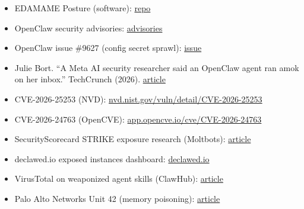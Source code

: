 \documentclass[
]{article}
\providecommand{\tightlist}{%
  \setlength{\itemsep}{0pt}\setlength{\parskip}{0pt}}
\begin{document}
\begin{itemize}
\tightlist
\item
  EDAMAME Posture (software):
  \href{https://github.com/edamametechnologies/edamame_posture}{repo}
\item
  OpenClaw security advisories:
  \href{https://github.com/openclaw/openclaw/security/advisories}{advisories}
\item
  OpenClaw issue \#9627 (config secret sprawl):
  \href{https://github.com/openclaw/openclaw/issues/9627}{issue}
\item
  Julie Bort. ``A Meta AI security researcher said an OpenClaw agent ran
  amok on her inbox.'' TechCrunch (2026).
  \href{https://techcrunch.com/2026/02/23/a-meta-ai-security-researcher-said-an-openclaw-agent-ran-amok-on-her-inbox/}{article}
\item
  CVE-2026-25253 (NVD):
  \href{https://nvd.nist.gov/vuln/detail/CVE-2026-25253}{nvd.nist.gov/vuln/detail/CVE-2026-25253}
\item
  CVE-2026-24763 (OpenCVE):
  \href{https://app.opencve.io/cve/CVE-2026-24763}{app.opencve.io/cve/CVE-2026-24763}
\item
  SecurityScorecard STRIKE exposure research (Moltbots):
  \href{https://securityscorecard.com/blog/beyond-the-hype-moltbots-real-risk-is-exposed-infrastructure-not-ai-superintelligence/}{article}
\item
  declawed.io exposed instances dashboard:
  \href{https://declawed.io/}{declawed.io}
\item
  VirusTotal on weaponized agent skills (ClawHub):
  \href{https://blog.virustotal.com/2026/02/from-automation-to-infection-how.html}{article}
\item
  Palo Alto Networks Unit 42 (memory poisoning):
  \href{https://unit42.paloaltonetworks.com/indirect-prompt-injection-poisons-ai-longterm-memory/}{article}
\end{itemize}
\end{document}
